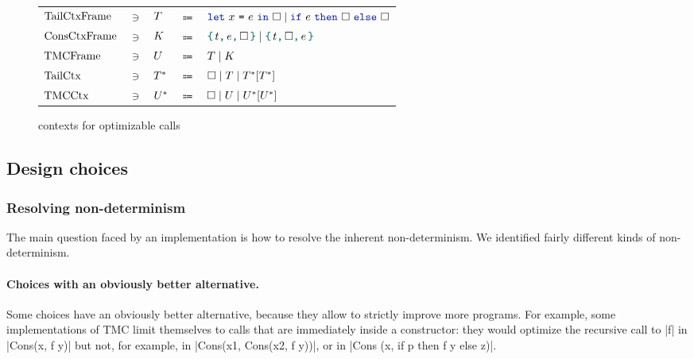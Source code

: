 \begin{figure}[tp]
    \begin{tabular}{lclcl}
            $\datalangTailFrame[]$
            & $\ni$ &
            $\datalangTailFrame$
            & $\Coloneqq$ &
            $\datalangLet {\datalangVar} {\datalangExpr} \datalangCtxHole \mid \datalangIf \datalangExpr \datalangCtxHole \datalangCtxHole$
\\
            $\datalangConsFrame[]$
            & $\ni$ &
            $\datalangConsFrame$
            & $\Coloneqq$ &
            $\datalangBlock \datalangTag \datalangExpr \datalangCtxHole
            \mid \datalangBlock \datalangTag \datalangCtxHole \datalangExpr$
\\
            $\datalangTMCFrame[]$
            & $\ni$ &
            $\datalangTMCFrame$
            & $\Coloneqq$ &
            $\datalangTailFrame
             \mid
             \datalangConsFrame$
\\
            $\datalangTailCtx[]$
            & $\ni$ &
            $\datalangTailCtx$
            & $\Coloneqq$ &
            $\datalangCtxHole
             \mid
             \datalangTailFrame
             \mid
             \datalangTailCtx{[\datalangTailCtx]}$
\\
            $\datalangTMCCtx[]$
            & $\ni$ &
            $\datalangTMCCtx$
            & $\Coloneqq$ &
            $\datalangCtxHole
             \mid
             \datalangTMCFrame
             \mid
             \datalangTMCCtx{[\datalangTMCCtx]}$
    \end{tabular}
    \caption{\DataLang contexts for optimizable calls}
    \label{fig:contexts}
\end{figure}

\subsection{Design choices}

\subsubsection{Resolving non-determinism}

The main question faced by an implementation is how to resolve the
inherent non-determinism. We identified fairly different kinds of
non-determinism.

\paragraph{Choices with an obviously better alternative.} Some choices have an obviously better alternative, because they allow to strictly improve more programs. For example, some implementations of TMC limit themselves to calls that are immediately inside a constructor: they would optimize the recursive call to \ocaml|f| in \ocaml|Cons(x, f y)| but not, for example, in \ocaml|Cons(x1, Cons(x2, f y))|, or in \ocaml|Cons (x, if p then f y else z)|.

